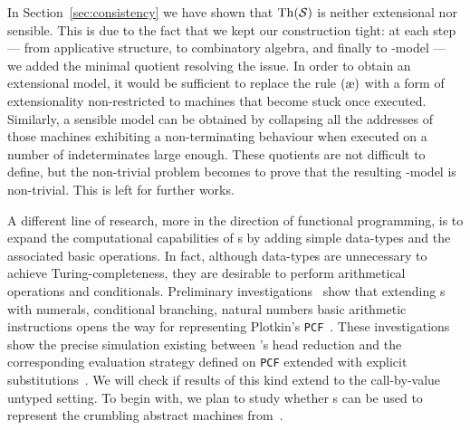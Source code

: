 In Section~\ref{sec:consistency} we have shown that $\mathrm{Th}(\mathcal{S})$ is neither extensional nor sensible. This is due to the fact that we kept our construction tight: at each step --- from applicative structure, to combinatory algebra, and finally to \lam-model --- we added the minimal quotient resolving the issue. In order to obtain an extensional model, it would be sufficient to replace the rule $\extrule$ with a form of extensionality non-restricted to machines that become stuck once executed. Similarly, a sensible model can be obtained by collapsing all the addresses of those machines exhibiting a non-terminating behaviour when executed on a number of indeterminates large enough.
These quotients are not difficult to define, but the non-trivial problem becomes to prove that the resulting \lam-model is non-trivial. This is left for further works.

A different line of research, more in the direction of functional programming, is to expand the computational capabilities of \am s by adding simple data-types and the associated basic operations. In fact, although data-types are unnecessary to achieve Turing-completeness, they are desirable to perform arithmetical operations and conditionals.
Preliminary investigations~\cite{IntrigilaMM21} show that extending \am s with numerals, conditional branching, natural numbers basic arithmetic instructions opens the way for representing Plotkin's {\tt PCF}~\cite{Plotkin77}. These investigations show the precise simulation existing between \am 's head reduction and the corresponding evaluation strategy defined on {\tt PCF} extended with explicit substitutions~\cite{LevyM99}. %
We will check if results of this kind extend to the call-by-value untyped setting. To begin with, we plan to study whether \am s can be used to represent the crumbling abstract machines from~\cite{AccattoliCGC19}.



